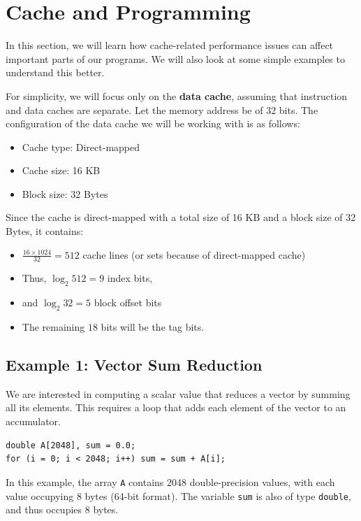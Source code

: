 \documentclass[12pt]{book}
\begin{document}
\section{Cache and Programming}
In this section, we will learn how cache-related performance issues can affect important parts of our programs. We will also look at some simple examples to understand this better. 

For simplicity, we will focus only on the \textbf{data cache}, assuming that instruction and data caches are separate. Let the memory address be of $32$ bits. The configuration of the data cache we will be working with is as follows:
\begin{itemize}
    \item Cache type: Direct-mapped
    \item Cache size: 16 KB
    \item Block size: 32 Bytes
\end{itemize}

Since the cache is direct-mapped with a total size of 16 KB and a block size of 32 Bytes, it contains:
\begin{itemize}
    \item $\frac{16 \times 1024}{32} = 512$ cache lines (or sets because of direct-mapped cache)
    \item Thus, $\log_2 512 = 9$ index bits,
    \item and $\log_2 32 = 5$ block offset bits
    \item The remaining $18$ bits will be the tag bits.
\end{itemize}
\subsection{Example 1: Vector Sum Reduction}

We are interested in computing a scalar value that reduces a vector by summing all its elements. This requires a loop that adds each element of the vector to an accumulator.

\begin{lstlisting}[caption={Vector Sum Reduction}]
double A[2048], sum = 0.0;
for (i = 0; i < 2048; i++) sum = sum + A[i];
\end{lstlisting}

In this example, the array \texttt{A} contains 2048 double-precision values, with each value occupying $8$ bytes (64-bit format). The variable \texttt{sum} is also of type \texttt{double}, and thus occupies $8$ bytes.
\end{document}
